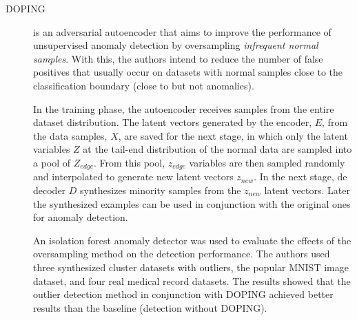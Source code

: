    
    

\begin{description}
    \item[DOPING \cite{lim.etal_DOPINGGenerativeData_2018}] is an adversarial autoencoder that aims to improve the performance of unsupervised anomaly detection by oversampling \textit{infrequent normal samples}. With this, the authors intend to reduce the number of false positives that usually occur on datasets with normal samples close to the classification boundary (close to but not anomalies). 

    In the training phase, the autoencoder receives samples from the entire dataset distribution. The latent vectors generated by the encoder, $E$, from the data samples, $X$, are saved for the next stage, in which only the latent variables $Z$ at the tail-end distribution of the normal data are sampled into a pool of $Z_{edge}$. From this pool, $z_{edge}$ variables are then sampled randomly and interpolated to generate new latent vectors $z_{new}$. In the next stage, de decoder $D$ synthesizes minority samples from the $z_{new}$ latent vectors. Later the synthesized examples can be used in conjunction with the original ones for anomaly detection.

    An isolation forest anomaly detector was used to evaluate the effects of the oversampling method on the detection performance. The authors used three synthesized cluster datasets with outliers, the popular MNIST image dataset, and four real medical record datasets. The results showed that the outlier detection method in conjunction with DOPING achieved better results than the baseline (detection without DOPING). 
\end{description}

